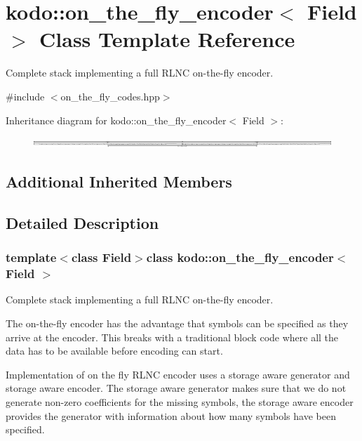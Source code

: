\hypertarget{classkodo_1_1on__the__fly__encoder}{\section{kodo\-:\-:on\-\_\-the\-\_\-fly\-\_\-encoder$<$ Field $>$ Class Template Reference}
\label{classkodo_1_1on__the__fly__encoder}
}


Complete stack implementing a full R\-L\-N\-C on-\/the-\/fly encoder.  




{\ttfamily \#include $<$on\-\_\-the\-\_\-fly\-\_\-codes.\-hpp$>$}

Inheritance diagram for kodo\-:\-:on\-\_\-the\-\_\-fly\-\_\-encoder$<$ Field $>$\-:\begin{figure}[H]
\begin{center}
\leavevmode
\includegraphics[height=0.261845cm]{classkodo_1_1on__the__fly__encoder}
\end{center}
\end{figure}
\subsection*{Additional Inherited Members}


\subsection{Detailed Description}
\subsubsection*{template$<$class Field$>$class kodo\-::on\-\_\-the\-\_\-fly\-\_\-encoder$<$ Field $>$}

Complete stack implementing a full R\-L\-N\-C on-\/the-\/fly encoder. 

The on-\/the-\/fly encoder has the advantage that symbols can be specified as they arrive at the encoder. This breaks with a traditional block code where all the data has to be available before encoding can start.

Implementation of on the fly R\-L\-N\-C encoder uses a storage aware generator and storage aware encoder. The storage aware generator makes sure that we do not generate non-\/zero coefficients for the missing symbols, the storage aware encoder provides the generator with information about how many symbols have been specified.


